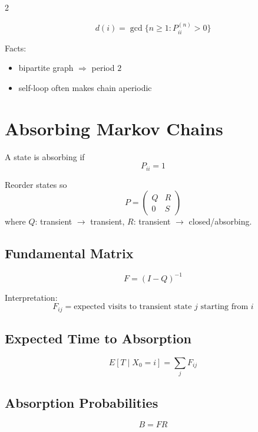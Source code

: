 \documentclass[10pt]{article}
\begin{document}
\begin{multicols}{2}
\begin{formulabox}
\[
d(i)=\gcd\{n\ge 1 : P_{ii}^{(n)}>0\}
\]
\end{formulabox}

Facts:
\begin{itemize}[leftmargin=12pt,itemsep=1pt]
\item bipartite graph \(\Rightarrow\) period \(2\)
\item self-loop often makes chain aperiodic
\end{itemize}

\section{Absorbing Markov Chains}

\begin{definitionbox}
A state is absorbing if
\[
P_{ii}=1
\]
\end{definitionbox}

Reorder states so
\[
P=
\begin{pmatrix}
Q & R\\
0 & S
\end{pmatrix}
\]
where \(Q\): transient \(\to\) transient, \(R\): transient \(\to\) closed/absorbing.

\subsection{Fundamental Matrix}

\begin{theorembox}
\[
F=(I-Q)^{-1}
\]
\end{theorembox}

Interpretation:
\[
F_{ij}=\text{expected visits to transient state }j\text{ starting from }i
\]

\subsection{Expected Time to Absorption}

\begin{formulabox}
\[
E[T\mid X_0=i]=\sum_j F_{ij}
\]
\end{formulabox}

\subsection{Absorption Probabilities}

\begin{formulabox}
\[
B=FR
\]
\end{formulabox}


\end{multicols}
\end{document}
